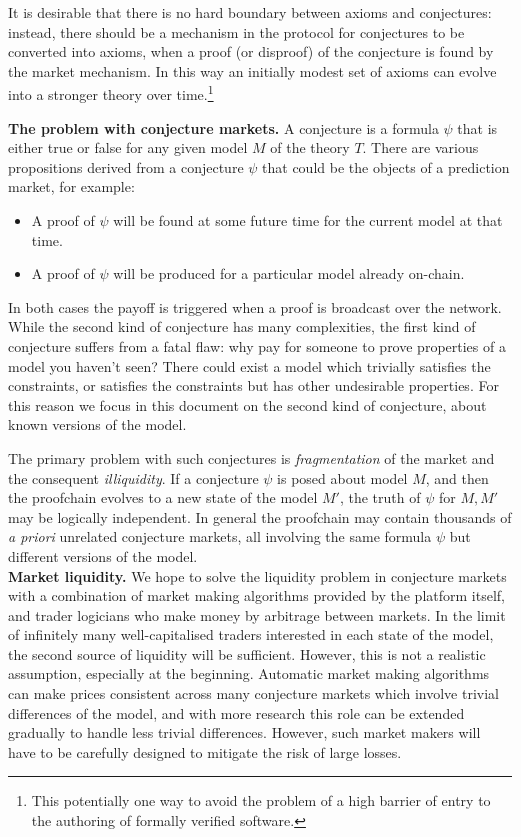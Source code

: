 \documentclass[english,letter paper,12pt,reqno]{article}
\theoremstyle{example}
\begin{document}
It is desirable that there is no hard boundary between axioms and conjectures: instead, there should be a mechanism in the protocol for conjectures to be converted into axioms, when a proof (or disproof) of the conjecture is found by the market mechanism. In this way an initially modest set of axioms can evolve into a stronger theory over time.\footnote{This potentially one way to avoid the problem of a high barrier of entry to the authoring of formally verified software.}
\vspace{0.2cm}

\textbf{The problem with conjecture markets.} A conjecture is a formula $\psi$ that is either true or false for any given model $M$ of the theory $T$. There are various propositions derived from a conjecture $\psi$ that could be the objects of a prediction market, for example:

\begin{itemize}
\item A proof of $\psi$ will be found at some future time for the current model at that time.
\item A proof of $\psi$ will be produced for a particular model already on-chain.
\end{itemize}
In both cases the payoff is triggered when a proof is broadcast over the network. While the second kind of conjecture has many complexities, the first kind of conjecture suffers from a fatal flaw: why pay for someone to prove properties of a model you haven't seen? There could exist a model which trivially satisfies the constraints, or satisfies the constraints but has other undesirable properties. For this reason we focus in this document on the second kind of conjecture, about known versions of the model.
 
The primary problem with such conjectures is \emph{fragmentation} of the market and the consequent \emph{illiquidity}. If a conjecture $\psi$ is posed about model $M$, and then the proofchain evolves to a new state of the model $M'$, the truth of $\psi$ for $M, M'$ may be logically independent. In general the proofchain may contain thousands of \emph{a priori} unrelated conjecture markets, all involving the same formula $\psi$ but different versions of the model.
\\

\textbf{Market liquidity.} We hope to solve the liquidity problem in conjecture markets with a combination of market making algorithms provided by the platform itself, and trader logicians who make money by arbitrage between markets. In the limit of infinitely many well-capitalised traders interested in each state of the model, the second source of liquidity will be sufficient. However, this is not a realistic assumption, especially at the beginning. Automatic market making algorithms can make prices consistent across many conjecture markets which involve trivial differences of the model, and with more research this role can be extended gradually to handle less trivial differences. However, such market makers will have to be carefully designed to mitigate the risk of large losses.
\end{document}
